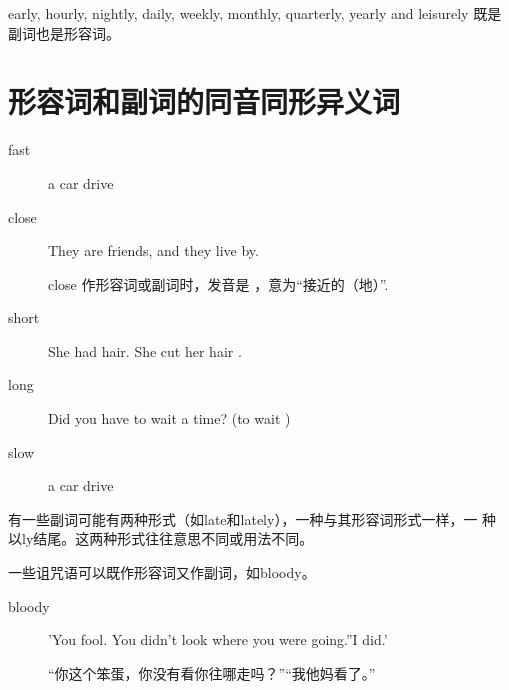 early, hourly, nightly, daily, weekly, monthly, quarterly, yearly and
leisurely 既是副词也是形容词。

\section{形容词和副词的同音同形异义词}

\begin{description}
\item[fast] a  car drive 
\item[close] They are  friends, and they live  by.

 close 作形容词或副词时，发音是 ，意为“接近的（地）”.
\item[short] She had  hair. She cut her hair .

\item[long] Did you have to wait a  time? (to wait )

\item[slow] a  car drive 
\end{description}

有一些副词可能有两种形式（如late和lately），一种与其形容词形式一样，一
种 以ly结尾。这两种形式往往意思不同或用法不同。

一些诅咒语可以既作形容词又作副词，如bloody。
\begin{description}
\item[bloody] 'You  fool. You didn't look where you were going.''I  did.'

  “你这个笨蛋，你没有看你往哪走吗？”“我他妈看了。”
\end{description}

